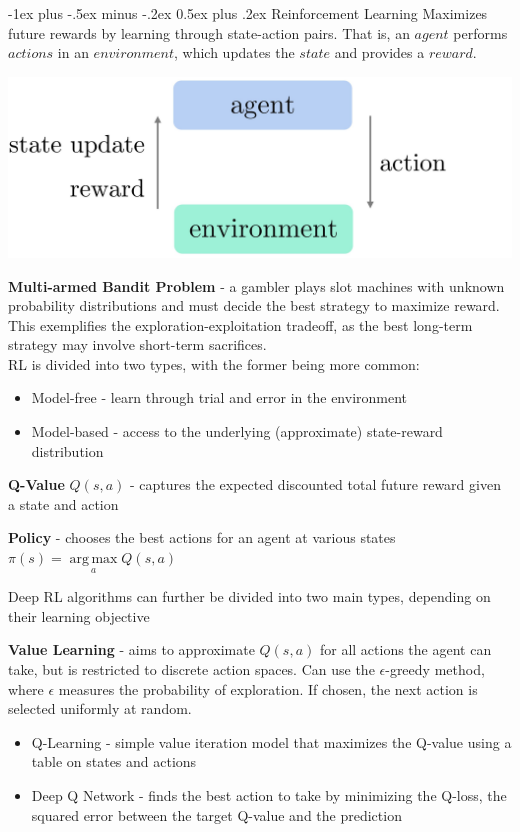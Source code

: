 \documentclass[10pt,landscape]{article}
\makeatletter
\DeclareMathOperator*{\argmax}{arg\,max}
\renewcommand{\section}{\@startsection{section}{1}{0mm}%
                                {-1ex plus -.5ex minus -.2ex}%
                                {0.5ex plus .2ex}%
                                {\normalfont\large\bfseries}}
\makeatother
\begin{document}
\begin{multicols}{3}
\section{Reinforcement Learning}
Maximizes future rewards by learning through state-action pairs. That is, an $agent$ performs $actions$ in an $environment$, which updates the $state$ and provides a $reward$.

\begin{center}
\vspace{-2mm}
    \includegraphics[scale = .085]{images/reinforcement4.JPG}
\end{center}
\vspace{-2.5mm}
\textbf{Multi-armed Bandit Problem} - a gambler plays slot machines with unknown probability distributions and must decide the best strategy to maximize reward. This exemplifies the exploration-exploitation tradeoff, as the best long-term strategy may involve short-term sacrifices.\\
\smallskip
RL is divided into two types, with the former being more common:
\begin{itemize}[label={--},leftmargin=4mm]
\itemsep -.4mm
\item Model-free - learn through trial and error in the environment
\item Model-based - access to the underlying (approximate) state-reward distribution
\end{itemize}

\textbf{Q-Value} $Q(s,a)$ - captures the expected discounted total future reward given a state and action

\textbf{Policy} - chooses the best actions for an agent at various states \\
$ \pi(s) = \argmax\limits_a Q(s,a)$\\
\smallskip

Deep RL algorithms can further be divided into two main types, depending on their learning objective

\textbf{Value Learning} - aims to approximate $Q(s,a)$ for all actions the agent can take, but is restricted to discrete action spaces. Can use the $\epsilon$-greedy method, where $\epsilon$ measures the probability of exploration. If chosen, the next action is selected uniformly at random.
\begin{itemize}[label={--},leftmargin=4mm]
\itemsep -.4mm
\item Q-Learning - simple value iteration model that maximizes the Q-value using a table on states and actions
\item Deep Q Network - finds the best action to take by minimizing the Q-loss, the squared error between the target Q-value and the prediction
\end{itemize}


\end{multicols}
\end{document}
